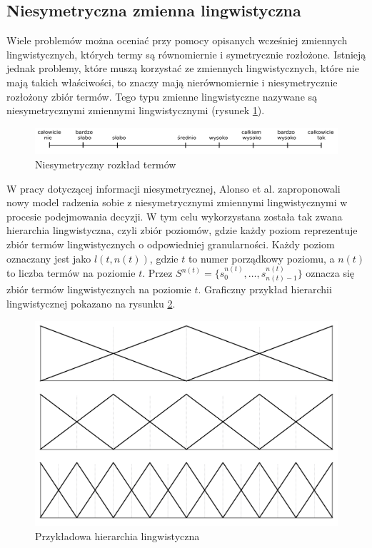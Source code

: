 \subsection{Niesymetryczna zmienna lingwistyczna}
Wiele problemów można oceniać przy pomocy opisanych wcześniej zmiennych
lingwistycznych, których termy są równomiernie i symetrycznie rozłożone.
Istnieją jednak problemy, które muszą korzystać ze zmiennych lingwistycznych,
które nie mają takich właściwości, to znaczy mają nierównomiernie i
niesymetrycznie rozłożony zbiór termów. Tego typu zmienne lingwistyczne nazywane
są niesymetrycznymi zmiennymi lingwistycznymi (rysunek
\ref{fig:niesymetryczna_zmienna}).
\begin{figure}[ht]
  \includegraphics[width=\linewidth]
    {chapters/preferences/niesymetryczna_zmienna}
  \caption{Niesymetryczny rozkład termów}
  \label{fig:niesymetryczna_zmienna}
\end{figure}

W pracy dotyczącej informacji niesymetrycznej, Alonso et al. zaproponowali nowy
model radzenia sobie z niesymetrycznymi zmiennymi lingwistycznymi w procesie
podejmowania decyzji. W tym celu wykorzystana została tak zwana hierarchia
lingwistyczna, czyli zbiór poziomów, gdzie każdy poziom reprezentuje zbiór
termów lingwistycznych o odpowiedniej granularności. Każdy poziom oznaczany jest
jako $l(t, n(t))$, gdzie $t$ to numer porządkowy poziomu, a $n(t)$ to liczba
termów na poziomie $t$. Przez $S^{n(t)} = \{s^{n(t)}_0, \dotsc,
s^{n(t)}_{n(t)-1}\}$ oznacza się zbiór termów lingwistycznych na poziomie $t$.
Graficzny przykład hierarchii lingwistycznej pokazano na rysunku
\ref{fig:hierarchia_lingwistyczna}.
\begin{figure}[hb]
  \includegraphics[width=\linewidth]
    {chapters/preferences/hierarchia_lingwistyczna}
  \caption{Przykładowa hierarchia lingwistyczna}
  \label{fig:hierarchia_lingwistyczna}
\end{figure}

